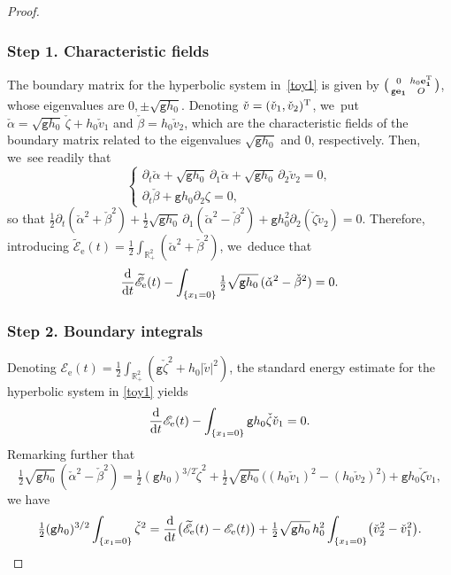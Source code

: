 \documentclass[10pt]{amsart}
\newenvironment{smallpmatrix}{\big(\begin{smallmatrix}}{\end{smallmatrix}\big)}
\newcommand{\gr}{{\mathtt g}}
\newcommand{\R}{{\mathbb R}}
\newcommand{\dt}{\partial_t}
\theoremstyle{definition}
\begin{document}
\skpt\begin{proof}\vspace*{-10pt}
\subsubsection*{Step 1. Characteristic fields}
The boundary matrix for the hyperbolic system in~\eqref{toy1} is given by
$\begin{smallpmatrix} 0 & h_0\bf{e}_1^{\rm T} \\ \gr\bf{e}_1 & O\end{smallpmatrix}$, whose eigenvalues are $0, \pm\sqrt{\gr h_0}$.
Denoting $\check{v}=(\check{v}_1,\check{v}_2)^{\rm T}$, we~put $\check{\alpha}=\sqrt{\gr h_0}\,\check{\zeta}+h_0\check{v}_1$ and $\check{\beta} = h_0\check{v}_2$,
which are the characteristic fields of the boundary matrix related to the eigenvalues $\sqrt{\gr h_0}$ and $0$, respectively.
Then, we~see readily that
\[
\begin{cases}
\dt \check{\alpha}+\sqrt{\gr h_0}\,\partial_1 \check{\alpha}+\sqrt{\gr h_0}\,\partial_2 \check{v}_2=0, \\
\dt \check{\beta}+\gr h_0\partial_2 \zeta=0,
\end{cases}
\]
so that
$\tfrac12\dt(\check{\alpha}^2+\check{\beta}^2)+\tfrac12\sqrt{\gr h_0}\,\partial_1(\check{\alpha}^2-\check{\beta}^2)+\gr h_0^2\partial_2(\check{\zeta}\check{v}_2)=0$.
Therefore, introducing $\widetilde{\mathscr E}_\mathrm{e}(t)=\frac{1}{2}\int_{\R^2_+} (\check{\alpha}^2+\check{\beta}^2)$, we~deduce that
\[
\frac{\rm d}{{\rm d}t}\widetilde{\mathscr E}_\mathrm{e}(t)-\int_{\{x_1=0\}}\tfrac12\sqrt{\gr h_0}\,(\check{\alpha}^2-\check{\beta}^2)=0.
\]

\subsubsection*{Step 2. Boundary integrals}
Denoting ${\mathscr E}_\mathrm{e}(t)=\frac{1}{2}\int_{\R_+^2} (\gr \check{\zeta}^2 +h_0 |\check{v}|^2)$,
the standard energy estimate for the hyperbolic system in \eqref{toy1} yields
\[
\frac{\rm d}{{\rm d}t} {\mathscr E}_\mathrm{e}(t) - \int_{\{x_1=0\}}{\gr h_0}\check{\zeta}\check{v}_1 = 0.
\]
Remarking further that
\[
\tfrac{1}{2}\sqrt{\gr h_0}\,(\check{\alpha}^2-\check{\beta}^2)
= \tfrac{1}{2}(\gr h_0)^{3/2} \check{\zeta}^2 + \tfrac{1}{2}\sqrt{\gr h_0}\,\big((h_0 \check{v}_1)^2-(h_0 \check{v}_2)^2\big)+\gr h_0 \check{\zeta}\check{v}_1,
\]
we have
\[
\tfrac{1}{2}(\gr h_0)^{3/2} \int_{\{x_1=0\}} \check{\zeta}^2=\frac{\rm d}{{\rm d}t}\bigl(\widetilde{\mathscr E}_\mathrm{e}(t) - {\mathscr E}_\mathrm{e}(t) \bigr)
+\tfrac{1}{2}\sqrt{\gr h_0}\,h_0^2 \int_{\{x_1=0\}} \bigl(\check{v}_2^2-\check{v}_1^2 \bigr).
\]


\end{proof}
\end{document}
